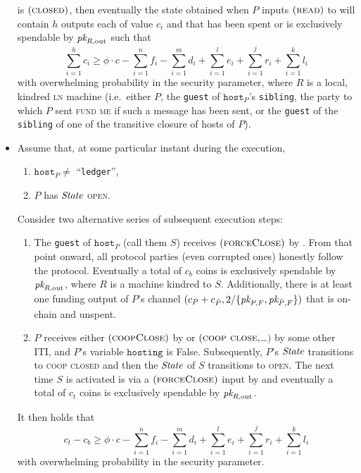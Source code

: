 \begin{lemma}
\begin{itemize}
    is $(\textsc{closed})$, then eventually the state obtained when $P$ inputs
    $(\textsc{read})$ to \ledger will contain $h$ outputs each of value $c_i$
    and that has been spent or is exclusively spendable by $\textit{pk}_{R,
    \mathrm{out}}$ such that
    \begin{equation}
    \label{lemma:real-balance-security:ineq}
      \sum\limits_{i=1}^h c_i \geq \phi \cdot c - \sum\limits_{i=1}^n f_i -
      \sum\limits_{i=1}^m d_i + \sum\limits_{i=1}^l e_i + \sum\limits_{i=1}^j
      r_i + \sum\limits_{i=1}^k l_i
    \end{equation}
    with overwhelming probability in the security parameter, where $R$ is a
    local, kindred \textsc{ln} machine (i.e.\ either $P$, the \texttt{guest} of
    $\texttt{host}_P$'s \texttt{sibling}, the party to which $P$ sent
    \textsc{fund me} if such a message has been sent, or the \texttt{guest} of
    the \texttt{sibling} of one of the transitive closure of hosts of $P$).
    \item Assume that, at some particular instant during the execution,
    \begin{enumerate}
      \item $\texttt{host}_P \neq$ ``\texttt{ledger}'',
      \item $P$ has $\itistate$ \textsc{open}.
    \end{enumerate}
    Consider two alternative series of subsequent execution steps:
    \begin{enumerate}
      \item The \texttt{guest} of $\texttt{host}_P$ (call them $S$) receives
      $(\textsc{forceClose})$ by \environment. From that point onward, all
      protocol parties (even corrupted ones) honestly follow the protocol.
      Eventually a total of $c_b$ coins is exclusively spendable by $\textit{pk}_{R,
      \mathrm{out}}$, where $R$ is a machine kindred to $S$. Additionally, there
      is at least one funding output of $P$'s channel $(c_P + c_{\bar{P}},
      2/\{\textit{pk}_{P, F}, \textit{pk}_{\bar{P}, F}\})$ that is on-chain and unspent.
      \item $P$ receives either $(\textsc{coopClose})$ by \environment or
      $(\textsc{coop close}, $\dots$)$ by some other ITI, and $P$'s variable
      $\texttt{hosting}$ is False. Subsequently, $P$'s $\itistate$ transitions
      to \textsc{coop closed} and then the $\itistate$ of $S$ transitions to
      \textsc{open}. The next time $S$ is activated is via a
      $(\textsc{forceClose})$ input by \environment and eventually a total of
      $c_t$ coins is exclusively spendable by $\textit{pk}_{R, \mathrm{out}}$.
    \end{enumerate}
    It then holds that
    \begin{equation}
      \label{eq:real-balance-coop-close}
      c_t - c_b \geq \phi \cdot c - \sum\limits_{i=1}^n f_i -
      \sum\limits_{i=1}^m d_i + \sum\limits_{i=1}^l e_i + \sum\limits_{i=1}^j
      r_i + \sum\limits_{i=1}^k l_i
    \end{equation}
    with overwhelming probability in the security parameter.
  \end{itemize}
\end{lemma}

